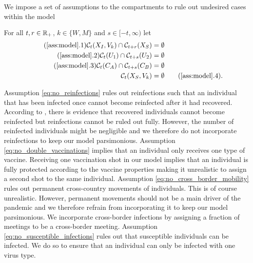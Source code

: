 We impose a set of assumptions to the compartments to rule out undesired cases within the model 
\begin{assumption}\label{ass:model}
For all $t,r \in \mathbb{R}_+$, $k \in \{W,M\}$ and $s \in [-t, \infty)$ let
\begin{align*}
\tag{\ref{ass:model}.1} 
\label{eq:no_reinfections}
\set(X_I, V_k) \cap \mathcal{C}_{t+r}(X_S) &= \emptyset \\
\tag{\ref{ass:model}.2} 
\label{eq:no_double_vaccinations}
\set(U_1) \cap \mathcal{C}_{t+s}(U_2) &= \emptyset \\
\tag{\ref{ass:model}.3} 
\label{eq:no_cross_border_mobility}
\set(C_A) \cap \mathcal{C}_{t+s}(C_B) &= \emptyset  \\
\set(X_S, V_k) &= \emptyset
\tag{\ref{ass:model}.4}.
\label{eq:no_susceptible_infections}
\end{align*}
\end{assumption}
Assumption \ref{eq:no_reinfections} rules out reinfections such that an individual that has been infected once cannot become reinfected after it had recovered. According to \cite{Roy.2020}, there is evidence that recovered individuals cannot become reinfected but reinfections cannot be ruled out fully. However, the number of reinfected individuals might be negligible and we therefore do not incorporate reinfections to keep our model parsimonious. Assumption \ref{eq:no_double_vaccinations} implies that an individual only receives one type of vaccine. Receiving one vaccination shot in our model implies that an individual is fully protected according to the vaccine properties making it unrealistic to assign a second shot to the same individual. Assumption \ref{eq:no_cross_border_mobility} rules out permanent cross-country movements of individuals. This is of course unrealistic. However, permanent movements should not be a main driver of the pandemic and we therefore refrain from incorporating it to keep our model parsimonious. We incorporate cross-border infections by assigning a fraction of meetings to be a cross-border meeting.
Assumption \ref{eq:no_susceptible_infections} rules out that susceptible individuals can be infected. We do so to ensure that an individual can only be infected with one virus type. 

